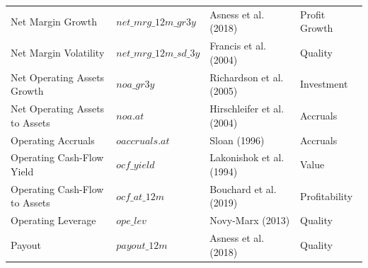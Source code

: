 \documentclass[preprint,12pt,authoryear]{elsarticle}
\begin{document}
\begin{appendices}
\begin{table}[pt]
\begin{tabularx}{\linewidth}{>{\raggedright\arraybackslash}m{3cm}>{\raggedright\arraybackslash}m{3.5cm}>{\raggedright\arraybackslash}m{4cm}>{\raggedright\arraybackslash}m{4cm}}
Net Margin Growth & $net\_mrg\_12m\_gr3y$ & Asness et al. (2018) & Profit Growth \\
Net Margin Volatility & $net\_mrg\_12m\_sd\_3y$ & Francis et al. (2004) & Quality \\
Net Operating Assets Growth  & $noa\_gr3y$ & Richardson et al. (2005) & Investment \\
Net Operating Assets to Assets & $noa.at$ & Hirschleifer et al. (2004) & Accruals \\
Operating Accruals & $oaccruals.at$ & Sloan (1996) & Accruals \\
Operating Cash-Flow Yield & $ocf\_yield$ & Lakonishok et al. (1994) & Value \\
Operating Cash-Flow to Assets & $ocf\_at\_12m$ &  Bouchard et al. (2019) & Profitability \\
Operating Leverage & $ope\_lev$ & Novy-Marx (2013) & Quality \\
Payout & $payout\_12m$ & Asness et al. (2018) & Quality \\
\hline
\end{tabularx}
\label{mostcitedarticles}
\end{table}


\end{appendices}
\end{document}

